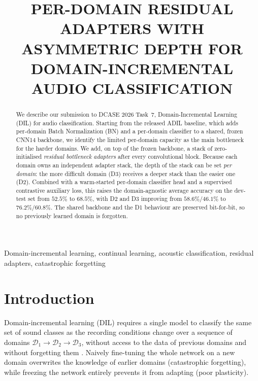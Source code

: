 \documentclass{article}
\title{PER-DOMAIN RESIDUAL ADAPTERS WITH ASYMMETRIC DEPTH FOR\\
DOMAIN-INCREMENTAL AUDIO CLASSIFICATION}
\begin{document}
\ninept
\maketitle

\begin{sloppy}

\begin{abstract}
We describe our submission to DCASE 2026 Task~7, Domain-Incremental Learning
(DIL) for audio classification. Starting from the released ADIL baseline,
which adds per-domain Batch Normalization (BN) and a per-domain classifier
to a shared, frozen CNN14 backbone, we identify the limited per-domain
capacity as the main bottleneck for the harder domains. We add, on top of
the frozen backbone, a stack of zero-initialised \emph{residual bottleneck
adapters} after every convolutional block. Because each domain owns an
independent adapter stack, the depth of the stack can be set
\emph{per domain}: the more difficult domain (D3) receives a deeper stack
than the easier one (D2). Combined with a warm-started per-domain classifier
head and a supervised contrastive auxiliary loss, this raises the
domain-agnostic average accuracy on the dev-test set from $52.5\%$
 to $68.5\%$, with D2 and D3 improving from
$58.6\%/46.1\%$ to $76.2\%/60.8\%$. The shared backbone and the D1 behaviour
are preserved bit-for-bit, so no previously learned domain is forgotten.
\end{abstract}

\begin{keywords}
Domain-incremental learning, continual learning, acoustic
classification, residual adapters, catastrophic forgetting
\end{keywords}


\section{Introduction}
\label{sec:intro}

Domain-incremental learning (DIL) requires a single model to classify the
same set of sound classes as the recording conditions change over a sequence
of domains $\mathcal{D}_1 \rightarrow \mathcal{D}_2 \rightarrow \mathcal{D}_3$,
without access to the data of previous domains and without forgetting them
\cite{mulimani2025dil}. Naively fine-tuning the whole network on a new domain
overwrites the knowledge of earlier domains (catastrophic forgetting), while
freezing the network entirely prevents it from adapting (poor plasticity).


\end{sloppy}
\end{document}
